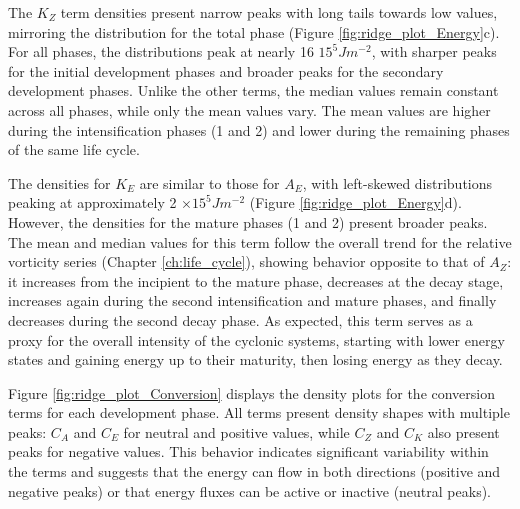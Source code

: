 The $K_Z$ term densities present narrow peaks with long tails towards low values, mirroring the distribution for the total phase (Figure \ref{fig:ridge_plot_Energy}c). For all phases, the distributions peak at nearly 16 $15^5 J m^{-2}$, with sharper peaks for the initial development phases and broader peaks for the secondary development phases. Unlike the other terms, the median values remain constant across all phases, while only the mean values vary. The mean values are higher during the intensification phases (1 and 2) and lower during the remaining phases of the same life cycle.


The densities for $K_E$ are similar to those for $A_E$, with left-skewed distributions peaking at approximately 2 $\times 15^5 J m^{-2}$ (Figure \ref{fig:ridge_plot_Energy}d). However, the densities for the mature phases (1 and 2) present broader peaks. The mean and median values for this term follow the overall trend for the relative vorticity series (Chapter \ref{ch:life_cycle}), showing behavior opposite to that of $A_Z$: it increases from the incipient to the mature phase, decreases at the decay stage, increases again during the second intensification and mature phases, and finally decreases during the second decay phase. As expected, this term serves as a proxy for the overall intensity of the cyclonic systems, starting with lower energy states and gaining energy up to their maturity, then losing energy as they decay.

Figure \ref{fig:ridge_plot_Conversion} displays the density plots for the conversion terms for each development phase. All terms present density shapes with multiple peaks: $C_A$ and $C_E$ for neutral and positive values, while $C_Z$ and $C_K$ also present peaks for negative values. This behavior indicates significant variability within the terms and suggests that the energy can flow in both directions (positive and negative peaks) or that energy fluxes can be active or inactive (neutral peaks).


